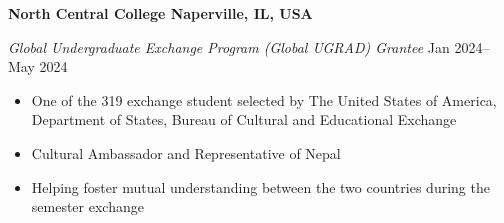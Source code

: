 \textbf{North Central College \hfill Naperville, IL, USA} \par
\textit{Global Undergraduate Exchange Program (Global UGRAD) Grantee} \hfill Jan 2024--May 2024 \par
\begin{itemize}
	\item One of the 319 exchange student selected by The United States of America, Department of States, Bureau of Cultural and Educational Exchange
	\item Cultural Ambassador and Representative of Nepal
    \item Helping foster mutual understanding between the two countries during the semester exchange
\end{itemize}\par